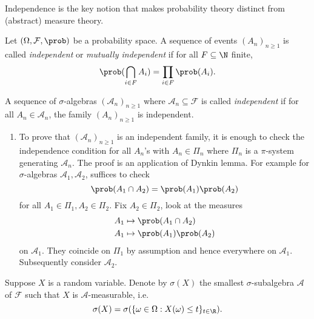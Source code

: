 \documentclass[a4paper]{article}
\renewcommand{\P}{\prob} %
\begin{document}
Independence is the key notion that makes probability theory distinct from (abstract) measure theory.

\begin{definition}[independence]
  Let \((\Omega, \mathcal F, \P)\) be a probability space. A sequence of events \((A_n)_{n \geq 1}\) is called \emph{independent} or \emph{mutually independent} if for all \(F \subseteq \N\) finite,
  \[
    \P(\bigcap_{i \in F} A_i) = \prod_{i \in F} \P(A_i).
  \]
\end{definition}

\begin{definition}
  A sequence of \(\sigma\)-algebras \((\mathcal A_n)_{n \geq 1}\) where \(\mathcal A_n \subseteq \mathcal F\) is called \emph{independent} if for all \(A_n \in \mathcal A_n\), the family \((A_n)_{n \geq 1}\) is independent.
\end{definition}

\begin{remark}\leavevmode
  \begin{enumerate}
  \item To prove that \((\mathcal A_n)_{n \geq 1}\) is an independent family, it is enough to check the independence condition for all \(A_n\)'s with \(A_n \in \Pi_n\) where \(\Pi_n\) is a \(\pi\)-system generating \(\mathcal A_n\). The proof is an application of Dynkin lemma. For example for \(\sigma\)-algebras \(\mathcal A_1, \mathcal A_2\), suffices to check
    \[
      \P(A_1 \cap A_2) = \P(A_1) \P(A_2)
    \]
    for all \(A_1 \in \Pi_1, A_2 \in \Pi_2\). Fix \(A_2 \in \Pi_2\), look at the measures
    \begin{align*}
      A_1 &\mapsto \P(A_1 \cap A_2) \\
      A_1 &\mapsto \P(A_1) \P(A_2)
    \end{align*}
    on \(\mathcal A_1\). They coincide on \(\Pi_1\) by assumption and hence everywhere on \(\mathcal A_1\). Subsequently consider \(\mathcal A_2\).
  \end{enumerate}
\end{remark}

\begin{notation}
  Suppose \(X\) is a random variable. Denote by \(\sigma(X)\) the smallest \(\sigma\)-subalgebra \(\mathcal A\) of \(\mathcal F\) such that \(X\) is \(\mathcal A\)-measurable, i.e.
  \[
    \sigma(X) = \sigma(\{\omega \in \Omega: X(\omega) \leq t\}_{t \in \R}).
  \]
\end{notation}
\end{document}
